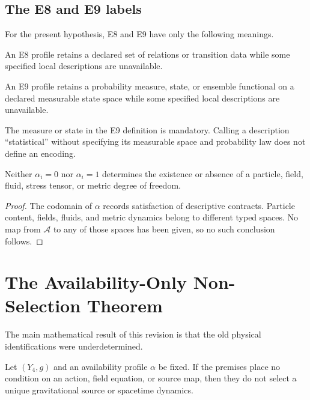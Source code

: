 \documentclass[11pt]{article}
\begin{document}
\subsection{The E8 and E9 labels}

For the present hypothesis, E8 and E9 have only the following meanings.

\begin{definition}
An E8 profile retains a declared set of relations or transition data while
some specified local descriptions are unavailable.
\end{definition}

\begin{definition}
An E9 profile retains a probability measure, state, or ensemble functional on
a declared measurable state space while some specified local descriptions are
unavailable.
\end{definition}

The measure or state in the E9 definition is mandatory.  Calling a description
``statistical'' without specifying its measurable space and probability law
does not define an encoding.

\begin{proposition}
Neither $\alpha_i=0$ nor $\alpha_i=1$ determines the existence or absence of a
particle, field, fluid, stress tensor, or metric degree of freedom.
\end{proposition}

\begin{proof}
The codomain of $\alpha$ records satisfaction of descriptive contracts.
Particle content, fields, fluids, and metric dynamics belong to different
typed spaces.  No map from $\mathcal A$ to any of those spaces has been given,
so no such conclusion follows.
\end{proof}

\section{The Availability-Only Non-Selection Theorem}

The main mathematical result of this revision is that the old physical
identifications were underdetermined.

\begin{theorem}
\label{thm:nonselection}
Let $(Y_4,g)$ and an availability profile $\alpha$ be fixed.  If the premises
place no condition on an action, field equation, or source map, then they do
not select a unique gravitational source or spacetime dynamics.
\end{theorem}
\end{document}
